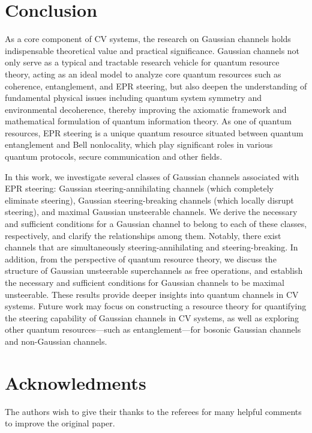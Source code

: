 \documentclass[10pt,aps,pra,amsfonts,amssymb,amsmath,%
floatfix,nofootinbib, groupedaddress,superscriptaddress,citesort,twocolumn
]{revtex4}%
\begin{document}
\section{Conclusion}

As a core component of CV systems, the research on Gaussian channels holds indispensable theoretical value and practical significance. Gaussian channels not only serve as a typical and tractable research vehicle for quantum resource theory, acting as an ideal model to analyze core quantum resources such as coherence, entanglement, and EPR steering, but also deepen the understanding of fundamental physical issues including quantum system symmetry and environmental decoherence, thereby improving the axiomatic framework and mathematical formulation of quantum information theory.
As one of quantum resources,  EPR steering is a unique quantum resource situated between quantum entanglement and Bell nonlocality, which  play  significant roles in various quantum protocols, secure communication and other fields.

In this work, we investigate several classes of Gaussian channels associated with EPR steering: Gaussian steering-annihilating channels (which completely eliminate steering), Gaussian steering-breaking channels (which locally disrupt steering), and maximal Gaussian unsteerable channels. We derive the necessary and sufficient conditions for a Gaussian channel to belong to each of these classes, respectively, and clarify the relationships among them. Notably, there exist channels that are simultaneously steering-annihilating and steering-breaking.
In addition, from the perspective of quantum resource theory, we discuss the structure of Gaussian unsteerable superchannels as free operations, and establish the necessary and sufficient conditions for Gaussian channels to be maximal unsteerable. These results provide deeper insights into quantum channels in CV systems. Future work may focus on constructing a resource theory for quantifying the steering capability of Gaussian channels in CV systems, as well as exploring other quantum resources—such as entanglement—for bosonic Gaussian channels and non-Gaussian channels.\\


\section{Acknowledments }   The authors wish to give their thanks to the referees for many
helpful comments to improve the original paper.
\end{document}
